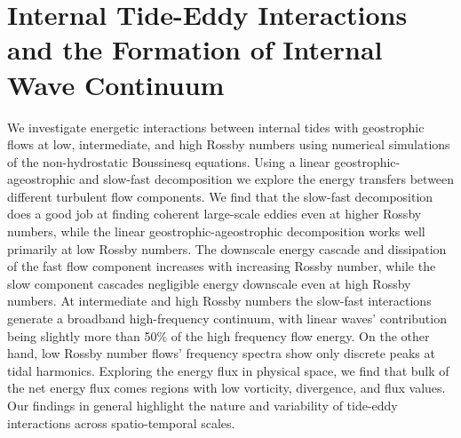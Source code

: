 \documentclass[../Rajarshi-thesis-draft.tex]{subfiles}
\begin{document}
\begingroup


\chapter{Internal Tide-Eddy Interactions and the Formation of Internal Wave Continuum}\label{tide-eddy}


\begin{summary}
We investigate energetic interactions between internal tides with geostrophic flows at low, intermediate, and high Rossby numbers using  numerical simulations of the non-hydrostatic Boussinesq equations. Using a linear geostrophic-ageostrophic and slow-fast decomposition we explore the energy transfers between different turbulent flow components. We find  that the slow-fast decomposition does a good job at finding coherent large-scale eddies even at higher Rossby numbers, while the linear geostrophic-ageostrophic decomposition works well primarily at low Rossby numbers. The downscale energy cascade and dissipation of the fast flow component increases with increasing Rossby number, while the slow component cascades negligible energy downscale even at high Rossby numbers. At intermediate and high Rossby numbers the slow-fast interactions generate a broadband high-frequency continuum, with linear waves' contribution being slightly more than 50\% of the high frequency flow energy. On the other hand, low Rossby number flows' frequency spectra show only discrete peaks at tidal harmonics. Exploring the energy flux in physical space, we find that bulk of the net energy flux comes regions with low vorticity, divergence, and flux values. Our findings in general highlight the nature and variability of tide-eddy interactions across spatio-temporal scales.
\end{summary}
\end{document}
